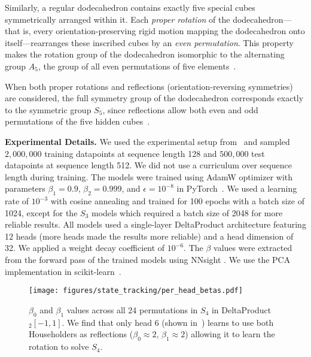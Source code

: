\documentclass{article} %
\begin{document}
Similarly, a regular dodecahedron contains exactly five special cubes symmetrically arranged within it. Each \textit{proper rotation} of the dodecahedron---that is, every orientation-preserving rigid motion mapping the dodecahedron onto itself---rearranges these inscribed cubes by an \textit{even permutation}. This property makes the rotation group of the dodecahedron isomorphic to the alternating group $A_5$, the group of all even permutations of five elements~\citep{foster1990symmetry}.

When both proper rotations and reflections (orientation-reversing symmetries) are considered, the full symmetry group of the dodecahedron corresponds exactly to the symmetric group $S_5$, since reflections allow both even and odd permutations of the five hidden cubes~\citep{foster1990symmetry}.



\textbf{Experimental Details.}
We used the experimental setup from~\citet{merrill-icml24a} and sampled $2{,}000{,}000$ training datapoints at sequence length 128 and $500{,}000$ test datapoints at sequence length 512. We did not use a curriculum over sequence length during training. The models were trained using AdamW optimizer \citep{loshchilov-iclr19a} with parameters $\beta_1=0.9$, $\beta_2=0.999$, and $\epsilon=10^{-8}$ in PyTorch~\citep{paszke-neurips19a}. We used a learning rate of $10^{-3}$ with cosine annealing \citep{loshchilov-iclr17a} and trained for  100 epochs with a batch size of 1024, except for the $S_3$ models which required a batch size of 2048 for more reliable results. All models used a single-layer DeltaProduct architecture featuring 12 heads (more heads made the results more reliable) and a head dimension of 32. We applied a weight decay coefficient of $10^{-6}$. The $\beta$ values were extracted from the forward pass of the trained models using NNsight \citep{kaufman-iclr24a}. We use the PCA implementation in scikit-learn~\citep{pedregosa2011scikit}.


\begin{figure}[H]
    \centering
    \texttt{[image: figures/state\_tracking/per\_head\_betas.pdf]}
    \vspace{-3mm}
    \caption{$\beta_0$ and $\beta_1$ values across all 24 permutations in $S_4$ in DeltaProduct$_2[-1, 1]$. We find that only head 6 (shown in~) learns to use both Householders as reflections ($\beta_0\approx 2$, $\beta_1\approx 2$) allowing it to learn the rotation to solve $S_4$.}
    \label{fig:app_beta_values_estimated}
\end{figure}
\end{document}
